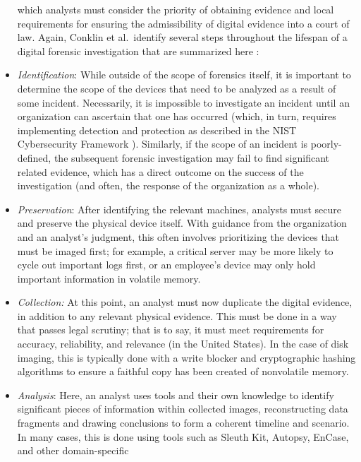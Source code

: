 \begin{itemize}
  which analysts must consider the priority of obtaining evidence and
  local requirements for ensuring the admissibility of digital evidence
  into a court of law. Again, Conklin et al.~identify several steps
  throughout the lifespan of a digital forensic investigation that are
  summarized here \cite{conklinComputerForensics2022}:
\item
  \emph{Identification}: While outside of the scope of forensics itself,
  it is important to determine the scope of the devices that need to be
  analyzed as a result of some incident. Necessarily, it is impossible
  to investigate an incident until an organization can ascertain that
  one has occurred (which, in turn, requires implementing detection and
  protection as described in the NIST Cybersecurity Framework
  \cite{nistNISTCybersecurityFramework2023}). Similarly, if the
  scope of an incident is poorly-defined, the subsequent forensic
  investigation may fail to find significant related evidence, which has
  a direct outcome on the success of the investigation (and often, the
  response of the organization as a whole).
\item
  \emph{Preservation}: After identifying the relevant machines, analysts
  must secure and preserve the physical device itself. With guidance
  from the organization and an analyst's judgment, this often involves
  prioritizing the devices that must be imaged first; for example, a
  critical server may be more likely to cycle out important logs first,
  or an employee's device may only hold important information in
  volatile memory.
\item
  \emph{Collection:} At this point, an analyst must now duplicate the
  digital evidence, in addition to any relevant physical evidence. This
  must be done in a way that passes legal scrutiny; that is to say, it
  must meet requirements for accuracy, reliability, and relevance
  \cite{conklinComputerForensics2022,garfinkelBringingScienceDigital2009}
  (in the United States). In the case of disk imaging, this is typically
  done with a write blocker and cryptographic hashing algorithms to
  ensure a faithful copy has been created of nonvolatile memory.
\item
  \emph{Analysis}: Here, an analyst uses tools and their own knowledge
  to identify significant pieces of information within collected images,
  reconstructing data fragments and drawing conclusions to form a
  coherent timeline and scenario. In many cases, this is done using
  tools such as Sleuth Kit, Autopsy, EnCase, and other domain-specific

\end{itemize}
